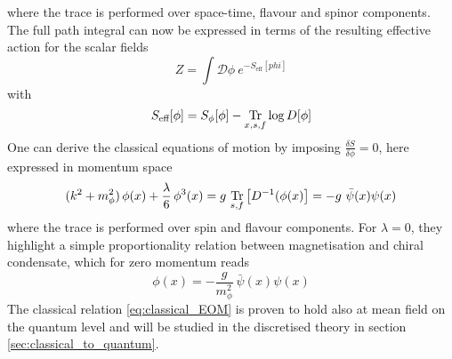 where the trace is performed over space-time, flavour and spinor components. \\ 
The full path integral can now be expressed in terms of the resulting effective action for the scalar fields
\begin{equation*}
    Z = \int \mathcal{D}\phi \ e^{-S_\text{eff}[phi]}
\end{equation*}
with
\begin{equation}
    S_\text{eff}[\phi] = S_{\phi}[\phi] - \underset{x,s,f}{\operatorname{\text{Tr}}} \log D[\phi]
    \label{eq:effective_action_no_fermions}
\end{equation}
One can derive the classical equations of motion by imposing $\frac{\delta S}{\delta \phi} = 0$, here expressed in momentum space
\begin{equation*}
     (k^2 + m_\phi^2) \, \phi(x) + \frac{\lambda}{6} \, \phi^3(x) = g \ \underset{s,f}{\tr} \left[D^{-1}(\phi(x)\right] = - g \ \bar\psi(x) \psi(x)
\end{equation*}
where the trace is performed over spin and flavour components. For $\lambda = 0$, they highlight a simple proportionality relation between magnetisation and chiral condensate, which for zero momentum reads
\begin{equation}
    \phi(x) = - \frac{g}{m_\phi^2} \ \bar \psi(x) \psi(x)
    \label{eq:classical_EOM}
\end{equation}
The classical relation \eqref{eq:classical_EOM} is proven to hold also at mean field on the quantum level \cite{Buballa2005NJL-modelMatter} and will be studied in the discretised theory in section \ref{sec:classical_to_quantum}. \\~\\


